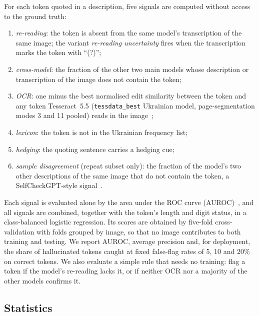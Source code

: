 For each token quoted in a description, five signals are computed without access to the ground truth:
\begin{enumerate}
\item \emph{re-reading}: the token is absent from the same model's transcription of the same image; the variant \emph{re-reading uncertainty} fires when the transcription marks the token with ``(?)'';
\item \emph{cross-model}: the fraction of the other two main models whose description or transcription of the image does not contain the token;
\item \emph{OCR}: one minus the best normalised edit similarity between the token and any token Tesseract~5.5 (\texttt{tessdata\_best} Ukrainian model, page-segmentation modes 3 and 11 pooled) reads in the image~\cite{smith2007overview};
\item \emph{lexicon}: the token is not in the Ukrainian frequency list;
\item \emph{hedging}: the quoting sentence carries a hedging cue;
\item \emph{sample disagreement} (repeat subset only): the fraction of the model's two other descriptions of the same image that do not contain the token, a SelfCheckGPT-style signal~\cite{manakul2023selfcheckgpt}.
\end{enumerate}
Each signal is evaluated alone by the area under the ROC curve (AUROC)~\cite{hanley1982meaning}, and all signals are combined, together with the token's length and digit status, in a class-balanced logistic regression. Its scores are obtained by five-fold cross-validation with folds grouped by image, so that no image contributes to both training and testing. We report AUROC, average precision and, for deployment, the share of hallucinated tokens caught at fixed false-flag rates of 5, 10 and 20\% on correct tokens. We also evaluate a simple rule that needs no training: flag a token if the model's re-reading lacks it, or if neither OCR nor a majority of the other models confirms it.

\subsection{Statistics}\label{sec:stats}

